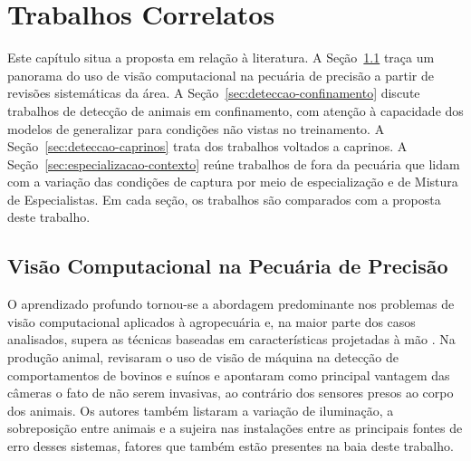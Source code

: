 %
%
%
\chapter{Trabalhos Correlatos}
\label{cap:trabalhos-correlatos}

Este capítulo situa a proposta em relação à literatura. A Seção~\ref{sec:vc-pecuaria} traça um panorama do uso de visão computacional na pecuária de precisão a partir de revisões sistemáticas da área. A Seção~\ref{sec:deteccao-confinamento} discute trabalhos de detecção de animais em confinamento, com atenção à capacidade dos modelos de generalizar para condições não vistas no treinamento. A Seção~\ref{sec:deteccao-caprinos} trata dos trabalhos voltados a caprinos. A Seção~\ref{sec:especializacao-contexto} reúne trabalhos de fora da pecuária que lidam com a variação das condições de captura por meio de especialização e de Mistura de Especialistas. Em cada seção, os trabalhos são comparados com a proposta deste trabalho.

\section{Visão Computacional na Pecuária de Precisão}
\label{sec:vc-pecuaria}

O aprendizado profundo tornou-se a abordagem predominante nos problemas de visão computacional aplicados à agropecuária e, na maior parte dos casos analisados, supera as técnicas baseadas em características projetadas à mão \cite{kamilaris2018deep}. Na produção animal,  revisaram o uso de visão de máquina na detecção de comportamentos de bovinos e suínos e apontaram como principal vantagem das câmeras o fato de não serem invasivas, ao contrário dos sensores presos ao corpo dos animais. Os autores também listaram a variação de iluminação, a sobreposição entre animais e a sujeira nas instalações entre as principais fontes de erro desses sistemas, fatores que também estão presentes na baia deste trabalho.

